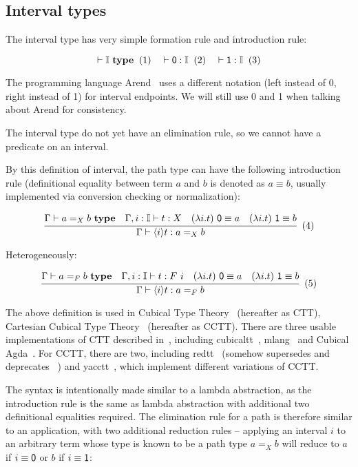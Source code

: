 \subsection{Interval types}
\label{subsec:interval}

The interval type has very simple formation rule
and introduction rule:

\[
  \vdash \mathbb I\ \textbf{type}
  \xtag \quad
  \vdash \textsf 0 : \mathbb I
  \xtag \quad
  \vdash \textsf 1 : \mathbb I
  \xtag
\]

The programming language Arend~\cite{Arend} uses a different notation
(\textsf{left} instead of \textsf 0, \textsf{right} instead of \textsf 1)
for interval endpoints.
We will still use \textsf 0 and \textsf 1 when talking
about Arend for consistency.

The interval type do not yet have an elimination rule,
so we cannot have a predicate on an interval.

By this definition of interval, the path type can
have the following introduction rule
(definitional equality between term $a$ and $b$
is denoted as $a \equiv b$,
usually implemented via conversion checking or normalization):

\[
  \cfrac{
    \Gamma \vdash a =_X b \ \textbf{type}
    \quad
    \Gamma, i : \mathbb I \vdash t : X
    \quad
    (\lambda i. t) \ \textsf 0 \equiv a
    \quad
    (\lambda i. t) \ \textsf 1 \equiv b
  }{
    \Gamma \vdash \lrangle i t : a =_X b
  }
  \xtag
\]

Heterogeneously:

\[
  \cfrac{
    \Gamma \vdash a =_F b \ \textbf{type}
    \quad
    \Gamma, i : \mathbb I \vdash t : F \ i
    \quad
    (\lambda i. t) \ \textsf 0 \equiv a
    \quad
    (\lambda i. t) \ \textsf 1 \equiv b
  }{
    \Gamma \vdash \lrangle i t : a =_F b
  }
  \xtag
\]

The above definition is used in Cubical Type Theory~\cite{CCHM,CHM}
(hereafter as CTT), Cartesian Cubical Type
Theory~\cite{CCTT,CCTT2,CHTT} (hereafter as CCTT).
There are three usable implementations of CTT described in~\cite{CHM},
including cubicaltt~\cite{CubicalTT},
mlang~\cite{Mlang} and Cubical Agda~\cite{CubicalAgda}.
For CCTT, there are two, including
redtt~\cite{RedTT} (somehow supersedes and deprecates
\RedPRL~\cite{RedPRL}) and yacctt~\cite{YaccTT},
which implement different variations of CCTT.

The syntax is intentionally made similar to a lambda abstraction,
as the introduction rule is the same as lambda abstraction with
additional two definitional equalities required.
The elimination rule for a path is therefore similar to an application,
with two additional reduction rules -- applying an interval $i$ to
an arbitrary term whose type is known to be a path type $a =_X b$
will reduce to $a$ if $i \equiv \textsf 0$ or $b$ if $i \equiv \textsf 1$:

